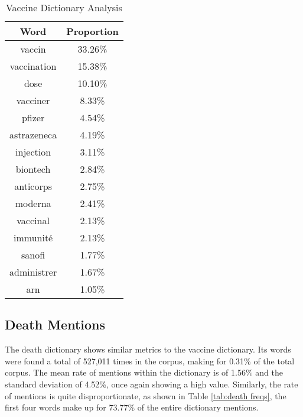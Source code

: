 \begin{table}[]
\caption{Vaccine Dictionary Analysis}
\label{tab:vaccine freqs}
\centering
\begin{tabular}{@{}cc@{}}
\toprule
Word      & Proportion \\ \midrule
vaccin      & 33.26\% \\
vaccination & 15.38\% \\
dose        & 10.10\% \\
vacciner    & 8.33\%  \\
pfizer      & 4.54\%  \\
astrazeneca & 4.19\%  \\
injection   & 3.11\%  \\
biontech    & 2.84\%  \\
anticorps   & 2.75\%  \\
moderna     & 2.41\%  \\
vaccinal    & 2.13\%  \\
immunité    & 2.13\%  \\
sanofi      & 1.77\%  \\
administrer & 1.67\%  \\
arn         & 1.05\%  \\ \bottomrule
\end{tabular}
\end{table}

\subsection{Death Mentions}

The death dictionary shows similar metrics to the vaccine dictionary. Its words were found a total of 527,011 times in the corpus, making for 0.31\% of the total corpus. The mean rate of mentions within the dictionary is of 1.56\% and the standard deviation of 4.52\%, once again showing a high value. Similarly, the rate of mentions is quite disproportionate, as shown in Table \ref{tab:death freqs}, the first four words make up for 73.77\% of the entire dictionary mentions.

